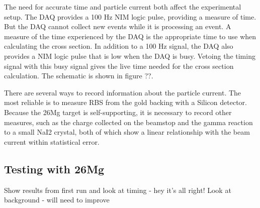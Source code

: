 The need for accurate time and particle current both affect the experimental setup.  The DAQ provides a 100 Hz NIM logic pulse, providing a measure of time.  But the DAQ cannot collect new events while it is processing an event.  A measure of the time experienced by the DAQ is the appropriate time to use when calculating the cross section.  In addition to a 100 Hz signal, the DAQ also provides a NIM logic pulse that is low when the DAQ is busy.  Vetoing the timing signal with this busy signal gives the live time needed for the cross section calculation.  The schematic is shown in figure ??.

There are several ways to record information about the particle current.  The most reliable is to measure RBS from the gold backing with a Silicon detector.  Because the 26Mg target is self-supporting, it is necessary to record other measures, such as the charge collected on the beamstop and the gamma reaction to a small NaI2 crystal, both of which show a linear relationship with the beam current within statistical error.



\subsection{Testing with 26Mg}
Show results from first run and look at timing - hey it's all right!
Look at background - will need to improve

%
% 
% 
